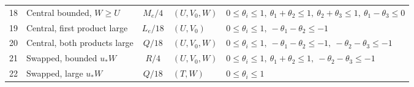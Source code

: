 \documentclass[11pt]{amsart}
\theoremstyle{definition}
\theoremstyle{remark}
\numberwithin{equation}{section}
\begin{document}
{\begin{longtable}{r p{} c p{} p{}}
18 & Central bounded, $W\ge U$ & $M_e/4$ & $(U,V_0,W)$ & $0\le\theta_i\le1,\ \theta_1+\theta_2\le 1,\ \theta_2+\theta_3\le 1,\ \theta_1-\theta_3\le 0$\\
19 & Central, first product large & $L_e/18$ & $(U,V_0)$ & $0\le\theta_i\le1,\ -\theta_1-\theta_2\le -1$\\
20 & Central, both products large & $Q/18$ & $(U,V_0,W)$ & $0\le\theta_i\le1,\ -\theta_1-\theta_2\le -1,\ -\theta_2-\theta_3\le -1$\\
21 & Swapped, bounded $u_*W$ & $R/4$ & $(U,V_0,W)$ & $0\le\theta_i\le1,\ \theta_1+\theta_2\le 1,\ -\theta_2-\theta_3\le -1$\\
22 & Swapped, large $u_*W$ & $Q/18$ & $(T,W)$ & $0\le\theta_i\le1$\\
\end{longtable}
}
\end{document}
